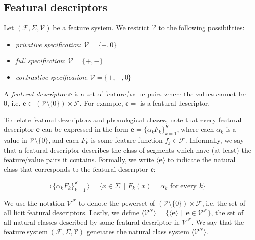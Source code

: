 \documentclass[11pt, oneside]{article}   	%
\begin{document}
\subsection{Featural descriptors}

Let $(\mathcal F, \Sigma, \mathcal V)$ be a feature system. We restrict $\mathcal V$ to the following possibilities: \begin{itemize}
    \item \textit{privative specification}: $\mathcal V = \{ +, 0 \}$
    \item \textit{full specification}: $\mathcal V = \{ +, - \}$
    \item \textit{contrastive specification}: $\mathcal V = \{ +, -, 0 \}$
    \end{itemize}

A \textit{featural descriptor} $\mathbf{e}$ is a set of feature/value pairs where the values cannot be $0$, i.e. $\mathbf{e} \subset (\mathcal V \setminus \{0\}) \times \mathcal F$. For example, $\mathbf{e} =$   is a featural descriptor.

To relate featural descriptors and phonological classes, note that every featural descriptor $\mathbf{e}$ can be expressed in the form $\mathbf{e} = \{\alpha_k F_k\}_{k=1}^K$, where each $\alpha_k$ is a value in $\mathcal V \setminus \{ 0 \}$, and each $F_k$ is some feature function $f_j \in \mathcal F$. Informally, we say that a featural descriptor describes the class of segments which have (at least) the feature/value pairs it contains. Formally, we write $\langle \mathbf{e} \rangle$ to indicate the natural class that corresponds to the featural descriptor $\mathbf{e}$:

$$ \langle \, \{\alpha_k F_k\}_{k=1}^K \, \rangle = \{x \in \Sigma \, \mid \, F_k(x) = \alpha_k \text{ for every } k \} $$

\vspace{\baselineskip} \noindent We use the notation $\mathcal V^\mathcal F$ to denote the powerset of $(\mathcal V \setminus \{0\}) \times \mathcal F$, i.e. the set of all licit featural descriptors. Lastly, we define $\langle \mathcal V^\mathcal F \rangle = \{ \langle \mathbf{e} \rangle \, \mid \, \mathbf{e} \in \mathcal V^\mathcal F \}$, the set of all natural classes described by some featural descriptor in $\mathcal V^\mathcal F$. We say that the feature system $(\mathcal F, \Sigma, \mathcal V)$ generates the natural class system $\langle \mathcal V^\mathcal F \rangle$.
\end{document}
